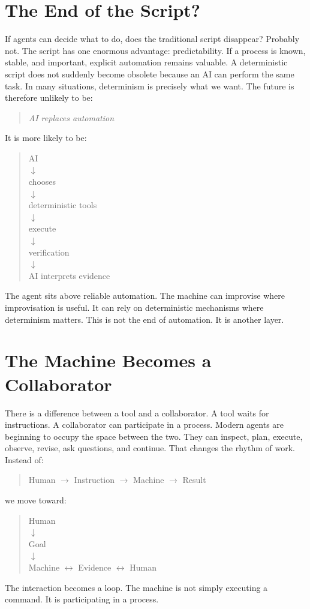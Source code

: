 \documentclass[11pt,twoside]{book}
\begin{document}
\section*{The End of the Script?}

If agents can decide what to do, does the traditional script disappear?
Probably not.
The script has one enormous advantage: predictability.
If a process is known, stable, and important, explicit automation remains valuable.
A deterministic script does not suddenly become obsolete because an AI can perform the same task.
In many situations, determinism is precisely what we want.
The future is therefore unlikely to be:
\begin{quote}
\emph{AI replaces automation}
\end{quote}
It is more likely to be:
\begin{quote}
\centering
AI\\
$\downarrow$\\
chooses\\
$\downarrow$\\
deterministic tools\\
$\downarrow$\\
execute\\
$\downarrow$\\
verification\\
$\downarrow$\\
AI interprets evidence
\end{quote}
The agent sits above reliable automation.
The machine can improvise where improvisation is useful.
It can rely on deterministic mechanisms where determinism matters.
This is not the end of automation.
It is another layer.

\section*{The Machine Becomes a Collaborator}

There is a difference between a tool and a collaborator.
A tool waits for instructions.
A collaborator can participate in a process.
Modern agents are beginning to occupy the space between the two.
They can inspect, plan, execute, observe, revise, ask questions, and continue.
That changes the rhythm of work.
Instead of:
\begin{quote}
\centering
Human $\rightarrow$ Instruction $\rightarrow$ Machine $\rightarrow$ Result
\end{quote}
we move toward:
\begin{quote}
\centering
Human\\
$\downarrow$\\
Goal\\
$\downarrow$\\
Machine $\leftrightarrow$ Evidence $\leftrightarrow$ Human
\end{quote}
The interaction becomes a loop.
The machine is not simply executing a command.
It is participating in a process.
\end{document}
